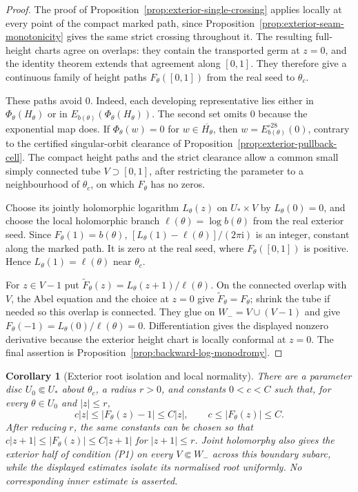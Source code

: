 \documentclass[11pt,a4paper]{article}
\newtheorem{corollary}[theorem]{Corollary}
\theoremstyle{definition}
\newcommand{\ii}{\mathrm{i}}
\begin{document}
\begin{proof}
The proof of Proposition~\ref{prop:exterior-single-crossing} applies
locally at every point of the compact marked path, since
Proposition~\ref{prop:exterior-seam-monotonicity} gives the same
strict crossing throughout it.  The resulting full-height charts
agree on overlaps: they contain the transported germ at $z=0$,
and the identity theorem extends that agreement along $[0,1]$.
They therefore give a continuous family of height paths
$F_\theta([0,1])$ from the real seed to $\theta_c$.

These paths avoid $0$.  Indeed, each developing representative
lies either in $\Phi_\theta(H_\theta)$ or in
$E_{b(\theta)}(\Phi_\theta(H_\theta))$.
The second set omits $0$ because the exponential map does.
If $\Phi_\theta(w)=0$ for $w\in\overline{H_\theta}$, then
$w=E_{b(\theta)}^{\circ28}(0)$, contrary to the certified
singular-orbit clearance of
Proposition~\ref{prop:exterior-pullback-cell}.
The compact height paths and the strict clearance allow a common
small simply connected tube $V\supset[0,1]$, after restricting
the parameter to a neighbourhood of $\theta_c$, on which
$F_\theta$ has no zeros.

Choose its jointly holomorphic logarithm $L_\theta(z)$ on
$U_*\times V$ by $L_\theta(0)=0$, and choose the local
holomorphic branch $\ell(\theta)=\log b(\theta)$ from the real
exterior seed.  Since $F_\theta(1)=b(\theta)$,
$[L_\theta(1)-\ell(\theta)]/(2\pi\ii)$ is an integer, constant
along the marked path.  It is zero at the real seed, where
$F_\theta([0,1])$ is positive.  Hence $L_\theta(1)=\ell(\theta)$
near $\theta_c$.

For $z\in V-1$ put
$\widetilde F_\theta(z)=L_\theta(z+1)/\ell(\theta)$.
On the connected overlap with $V$, the Abel equation and the
choice at $z=0$ give $\widetilde F_\theta=F_\theta$;
shrink the tube if needed so this overlap is connected.
They glue on $W_-=V\cup(V-1)$ and give
$F_\theta(-1)=L_\theta(0)/\ell(\theta)=0$.
Differentiation gives the displayed nonzero derivative because
the exterior height chart is locally conformal at $z=0$.
The final assertion is
Proposition~\ref{prop:backward-log-monodromy}.
\end{proof}

\begin{corollary}[Exterior root isolation and local normality]
\label{cor:exterior-boundary-normal}
There are a parameter disc $U_0\Subset U_*$ about $\theta_c$,
a radius $r>0$, and constants $0<c<C$ such that, for every
$\theta\in U_0$ and $|z|\le r$,
\[
 c|z|\le |F_\theta(z)-1|\le C|z|,
 \qquad c\le |F_\theta(z)|\le C.
\]
After reducing $r$, the same constants can be chosen so that
$c|z+1|\le |F_\theta(z)|\le C|z+1|$ for $|z+1|\le r$.
Joint holomorphy also gives the exterior half of condition (P1)
on every $V\Subset W_-$ across this boundary subarc, while the
displayed estimates isolate its normalised root uniformly.
No corresponding inner estimate is asserted.
\end{corollary}
\end{document}
